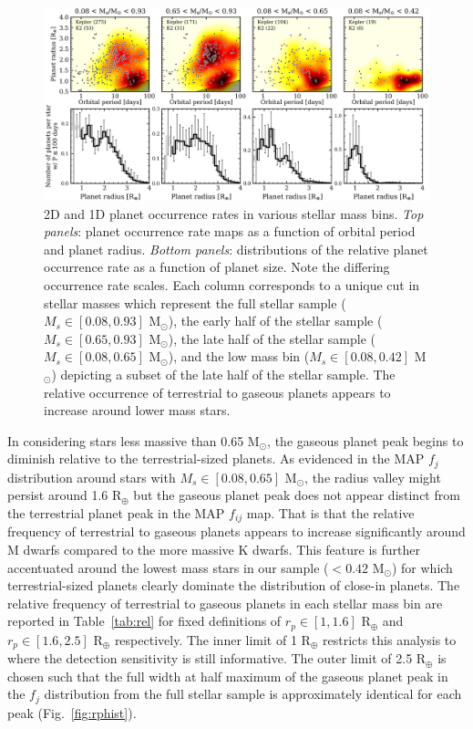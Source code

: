 \documentclass[twocolumn]{emulateapj}
\begin{document}
\begin{figure}
  \centering
  \includegraphics[width=.98\hsize]{figures/rphist_compMs.png}
  \caption{2D and 1D planet occurrence rates in various stellar mass bins. \emph{Top panels}: planet occurrence
    rate maps as a function of orbital period and planet radius. \emph{Bottom panels}: distributions of the relative
    planet occurrence rate as a function of planet size. Note the differing occurrence rate scales.
    Each column corresponds to a unique cut in stellar masses
    which represent the full stellar sample ($M_s \in [0.08,0.93]$ M$_{\odot}$), the early half of the stellar sample
    ($M_s \in [0.65,0.93]$ M$_{\odot}$), the late half of the stellar sample ($M_s \in [0.08,0.65]$ M$_{\odot}$),
    and the low mass bin ($M_s \in [0.08,0.42]$ M$_{\odot}$) depicting a subset of the late half of the stellar sample.
    The relative occurrence of terrestrial to gaseous planets appears to increase around lower mass stars.}
  \label{fig:rphistcomp}
\end{figure}

In considering stars less massive than 0.65 M$_{\odot}$, the gaseous planet peak begins to diminish relative
to the terrestrial-sized planets. As evidenced in the MAP $f_j$ distribution around stars with
$M_s \in [0.08,0.65]$ M$_{\odot}$, the radius valley might persist around 1.6 R$_{\oplus}$ but the gaseous planet
peak does not appear distinct from the terrestrial planet peak in the MAP $f_{ij}$ map. That is that the relative
frequency of terrestrial to gaseous planets appears to increase significantly around M dwarfs compared to the more
massive K dwarfs. This feature is further accentuated around the lowest mass stars in our sample ($<0.42$
M$_{\odot}$) for which terrestrial-sized planets clearly dominate the distribution of close-in planets. The relative
frequency of terrestrial to gaseous planets in each stellar mass bin are reported in Table~\ref{tab:rel}
for fixed definitions of $r_p \in [1,1.6]$ R$_{\oplus}$ and $r_p \in [1.6,2.5]$ R$_{\oplus}$ respectively. The inner
limit of 1 R$_{\oplus}$ restricts this analysis to where the detection sensitivity is still informative. The outer
limit of 2.5 R$_{\oplus}$ is chosen such that the full width at half maximum of the gaseous planet peak in the
$f_j$ distribution from the full stellar sample is approximately identical for each peak (Fig.~\ref{fig:rphist}).
\end{document}
